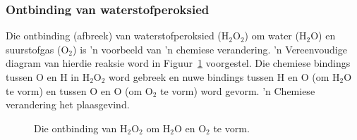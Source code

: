 \subsubsection*{Ontbinding van waterstofperoksied}
      \label{m38709*id62788}Die ontbinding (afbreek) van waterstofperoksied ($\text{H}_{2}\text{O}_{2}$) om water ($\text{H}_{2}\text{O}$) en suurstofgas ($\text{O}_{2}$) is 'n voorbeeld van 'n chemiese verandering. 'n Vereenvoudige diagram van hierdie reaksie word in  Figuur~\ref{fig:chemical change:decomposition} voorgestel. Die chemiese bindings tussen $\text{O}$ en $\text{H}$ in $\text{H}_{2}\text{O}_{2}$ word gebreek en nuwe bindings tussen $\text{H}$ en $\text{O}$ (om $\text{H}_{2}\text{O}$ te vorm) en tussen $\text{O}$ en $\text{O}$ (om $\text{O}_{2}$ te vorm) word gevorm. 'n Chemiese verandering het plaasgevind.\par 
    \setcounter{subfigure}{0}
\begin{figure}[H]
\begin{center}
\end{center}
\caption{Die ontbinding van $\text{H}_{2}\text{O}_{2}$ om $\text{H}_{2}\text{O}$ en $\text{O}_{2}$ te vorm.}
\label{fig:chemical change:decomposition}
\end{figure}     
\par
\label{m38709*secfhsst!!!underscore!!!id163}
